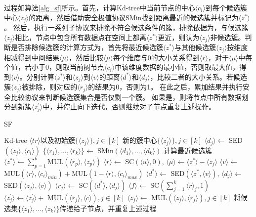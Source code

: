 过程如算法\ref{alg_sf}所示。首先，计算Kd-tree中当前节点的中心$ \langle  c_i  \rangle $到每个候选簇中心$ \langle  z_j  \rangle $的距离，然后借助安全极值协议SMin找到距离最近的候选簇并标记为$ \langle z^* \rangle $。
然后，执行一系列子协议来排除不符合候选条件的簇，排除依据为，与候选簇$ \langle z_j\rangle $相比，节点中包含所有数据点在空间上都离$ \langle z^* \rangle $更近，则认为$ \langle z_j \rangle $非候选簇。判断是否排除候选簇的计算方式为，首先将最近候选簇$ \langle  z^*  \rangle $与其他候选簇$ \langle  z_j  \rangle $按维度相减得到中间结果$ \langle  \mu  \rangle $，然后比较$ \langle  \mu  \rangle $每个维度与0的大小关系得到$ \langle  r  \rangle $，对于$ \langle  \mu  \rangle $中每个值，若小于0，则取当前树节点$ \langle  c_i  \rangle $中该维度数据的最小值，否则取最大值，得到$ \langle  v  \rangle $。分别计算$ \langle  z^*  \rangle $和$ \langle  z_j  \rangle $到$ \langle  v  \rangle $的距离$ \langle  d^*  \rangle $和$ \langle  d_j  \rangle $，比较二者的大小关系。若候选簇$ \langle  z_j  \rangle $被排除，则对应的$ \langle  r_j  \rangle $的结果为0，否则为1。
在此之后，累加结果并执行安全比较协议来判断候选簇集合是否仅剩一个簇。
如果是，则将节点中所有数据划分到新簇$ \langle  z^{\prime}_j  \rangle $中，并停止向下迭代，否则继续对子节点重复上述操作。
\begin{algorithm}[htbp]
	\renewcommand{\algorithmicrequire}{\textbf{输入:}}
	\renewcommand{\algorithmicensure}{\textbf{输出:}}
	\caption{SF}
	\label{alg_sf}
	\begin{algorithmic}[1]
		\REQUIRE Kd-tree $\langle tr \rangle$以及初始簇$\{\langle z_j \rangle\}, j\in[k]$
		\ENSURE 新的簇中心$\{\langle z^{\prime}_j\rangle\},j\in[k]$
		\STATE $\langle d_j \rangle \leftarrow$ SED$(\langle z_j \rangle, \langle c_i \rangle)$ %
		\ENDFOR
		\STATE $\{\langle r_1\rangle,...,\langle r_k\rangle\} \leftarrow$ SMin$(\langle d_1 \rangle,...,\langle d_k \rangle)$
		\STATE 计算最近候选簇$\langle z^* \rangle \leftarrow \sum_{p=1}^k$MUL$(\langle r_p \rangle,\langle z_p\rangle)$ %
		\STATE $\langle r \rangle \leftarrow$ SC$(\langle u \rangle, 0)$, $\langle \mu \rangle \leftarrow \langle z^{*} \rangle - \langle z_j\rangle$%
		\STATE $\langle v \rangle \leftarrow$ MUL$(\langle r\rangle, \langle c_i \rangle_{min})+ $MUL$(1-\langle r\rangle,\langle c_i\rangle_{max})$
		\STATE $\langle d^{*}\rangle \leftarrow$ SED$(\langle z^{*}, \langle v \rangle)$, $\langle d_j \rangle \leftarrow$ SED$(\langle z_j\rangle,\langle v\rangle)$ %
		\STATE $\langle r_j\rangle \leftarrow$ SC$(\langle d^{*}\rangle, \langle d_j\rangle)$
		\ENDFOR
		\STATE $\langle f \rangle \leftarrow$ SC$(\sum_{j=1}^{k}\langle r\rangle_j, 1)$
		\STATE $\langle z^{\prime}_j \rangle \leftarrow \langle z^{\prime}_j \rangle +$ MUL$(\langle r_j\rangle, \langle c \rangle),j\in[k]$ %
		\ELSE
		\STATE $\langle z_j \rangle \leftarrow$ MUL$(\langle z_j \rangle, \langle r_j\rangle), j\in[k]$
		\STATE 将候选集$\{\langle z_1 \rangle,...,\langle z_k\rangle\}$传递给子节点，并重复上述过程
		\ENDIF
		\ENDFOR
	\end{algorithmic}
\end{algorithm}

